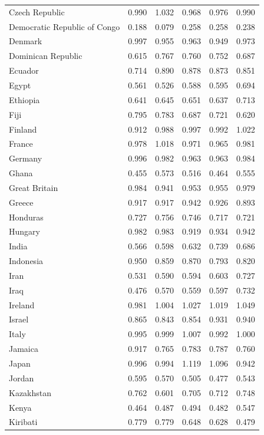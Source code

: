 \documentclass[runningheads]{llncs}
\begin{document}
{\begin{longtable}{p{}rrrrr}
Czech Republic & 0.990 & 1.032 & 0.968 & 0.976 & 0.990 \\
Democratic Republic of Congo & 0.188 & 0.079 & 0.258 & 0.258 & 0.238 \\
Denmark & 0.997 & 0.955 & 0.963 & 0.949 & 0.973 \\
Dominican Republic & 0.615 & 0.767 & 0.760 & 0.752 & 0.687 \\
Ecuador & 0.714 & 0.890 & 0.878 & 0.873 & 0.851 \\
Egypt & 0.561 & 0.526 & 0.588 & 0.595 & 0.694 \\
Ethiopia & 0.641 & 0.645 & 0.651 & 0.637 & 0.713 \\
Fiji & 0.795 & 0.783 & 0.687 & 0.721 & 0.620 \\
Finland & 0.912 & 0.988 & 0.997 & 0.992 & 1.022 \\
France & 0.978 & 1.018 & 0.971 & 0.965 & 0.981 \\
Germany & 0.996 & 0.982 & 0.963 & 0.963 & 0.984 \\
Ghana & 0.455 & 0.573 & 0.516 & 0.464 & 0.555 \\
Great Britain & 0.984 & 0.941 & 0.953 & 0.955 & 0.979 \\
Greece & 0.917 & 0.917 & 0.942 & 0.926 & 0.893 \\
Honduras & 0.727 & 0.756 & 0.746 & 0.717 & 0.721 \\
Hungary & 0.982 & 0.983 & 0.919 & 0.934 & 0.942 \\
India & 0.566 & 0.598 & 0.632 & 0.739 & 0.686 \\
Indonesia & 0.950 & 0.859 & 0.870 & 0.793 & 0.820 \\
Iran & 0.531 & 0.590 & 0.594 & 0.603 & 0.727 \\
Iraq & 0.476 & 0.570 & 0.559 & 0.597 & 0.732 \\
Ireland & 0.981 & 1.004 & 1.027 & 1.019 & 1.049 \\
Israel & 0.865 & 0.843 & 0.854 & 0.931 & 0.940 \\
Italy & 0.995 & 0.999 & 1.007 & 0.992 & 1.000 \\
Jamaica & 0.917 & 0.765 & 0.783 & 0.787 & 0.760 \\
Japan & 0.996 & 0.994 & 1.119 & 1.096 & 0.942 \\
Jordan & 0.595 & 0.570 & 0.505 & 0.477 & 0.543 \\
Kazakhstan & 0.762 & 0.601 & 0.705 & 0.712 & 0.748 \\
Kenya & 0.464 & 0.487 & 0.494 & 0.482 & 0.547 \\
Kiribati & 0.779 & 0.779 & 0.648 & 0.628 & 0.479 \\

\end{longtable}}
\end{document}
